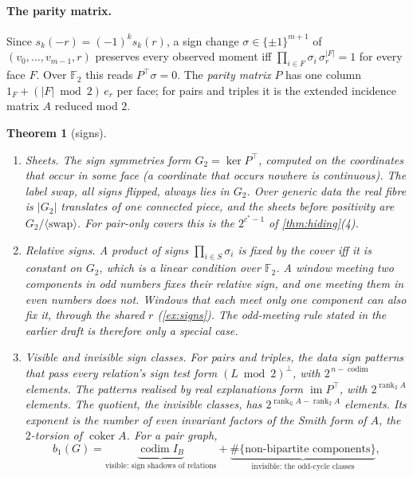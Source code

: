 \documentclass[11pt]{article}
\newtheorem{theorem}{Theorem}\newtheorem{proposition}[theorem]{Proposition}\newtheorem{lemma}[theorem]{Lemma}\newtheorem{corollary}[theorem]{Corollary}
\theoremstyle{definition}\newtheorem{definition}[theorem]{Definition}\newtheorem{remark}[theorem]{Remark}\newtheorem{example}[theorem]{Example}
\begin{document}
\paragraph{The parity matrix.} Since $s_k(-r)=(-1)^ks_k(r)$, a sign change $\sigma\in\{\pm1\}^{m+1}$ of $(v_0,\dots,v_{m-1},r)$ preserves
every observed moment iff $\prod_{i\in F}\sigma_i\,\sigma_r^{|F|}=1$ for every face $F$. Over $\mathbb F_2$ this reads $P^\top\sigma=0$. The
\emph{parity matrix} $P$ has one column $1_F+(|F|\bmod2)\,e_r$ per face; for pairs and triples it is the extended incidence matrix
$A$ reduced mod $2$.

\begin{theorem}[signs]\label{thm:signs}
\begin{enumerate}
\item[(1)] \emph{Sheets.} The sign symmetries form $G_2=\ker P^\top$, computed on the coordinates that occur in some face (a coordinate
  that occurs nowhere is continuous). The label swap, all signs flipped, always lies in $G_2$. Over generic data the real fibre is $|G_2|$
  translates of one connected piece, and the sheets before positivity are $G_2/\langle\text{swap}\rangle$. For pair-only covers this is
  the $2^{c^*-1}$ of \cref{thm:hiding}(4).
\item[(2)] \emph{Relative signs.} A product of signs $\prod_{i\in S}\sigma_i$ is fixed by the cover iff it is constant on $G_2$, which is
  a linear condition over $\mathbb F_2$. A window meeting two components in odd numbers fixes their relative sign, and one meeting them
  in even numbers does not. Windows that each meet only one component can also fix it, through the shared $r$ (\cref{ex:signs}). The
  odd-meeting rule stated in the earlier draft is therefore only a special case.
\item[(3)] \emph{Visible and invisible sign classes.} For pairs and triples, the data sign patterns that pass every relation's sign test
  form $(L\bmod2)^\perp$, with $2^{\,n-\operatorname{codim}}$ elements. The patterns realised by real explanations form
  $\operatorname{im}P^\top$, with $2^{\operatorname{rank}_2A}$ elements. The quotient, the \emph{invisible} classes, has
  $2^{\operatorname{rank}_\mathbb QA-\operatorname{rank}_2A}$ elements. Its exponent is the number of even invariant factors of the Smith
  form of $A$, the $2$-torsion of $\operatorname{coker}A$. For a pair graph,
\[
b_1(G)=\underbrace{\operatorname{codim}I_B}_{\text{visible: sign shadows of relations}}+\underbrace{\#\{\text{non-bipartite components}\}}_{\text{invisible: the odd-cycle classes}} ,
\]
\end{enumerate}
\end{theorem}
\end{document}
